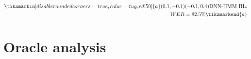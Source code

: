 \documentclass{beamer}
\begin{document}
\begin{frame}
\begin{minipage}[bt]{.7\textwidth}
  \end{minipage}%
  \begin{minipage}[tb]{.25\textwidth}
    \begin{equation*}
    \begin{split}
      \tikzmarkin[disable rounded corners=true, color=tug_red!50]{a}(0.1,-0.1)(-0.1  ,0.4)
      \text{DNN-HMM BL:} \\ WER = 82.5 \%
      \tikzmarkend{a}
    \end{split}
    \end{equation*}  
  \end{minipage}
\end{frame}



\section{Oracle analysis}
\end{document}
